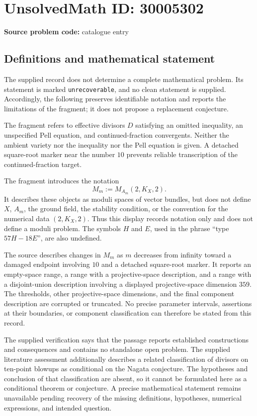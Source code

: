 \documentclass[11pt]{article}
\begin{document}
\section*{UnsolvedMath ID: 30005302}
\textbf{Source problem code:} catalogue entry
\subsection{Definitions and mathematical statement}
The supplied record does not determine a complete mathematical problem. Its statement is marked \texttt{unrecoverable}, and no clean statement is supplied. Accordingly, the following preserves identifiable notation and reports the limitations of the fragment; it does not propose a replacement conjecture.

The fragment refers to effective divisors \(D\) satisfying an omitted inequality, an unspecified Pell equation, and continued-fraction convergents. Neither the ambient variety nor the inequality nor the Pell equation is given. A detached square-root marker near the number \(10\) prevents reliable transcription of the continued-fraction target.

The fragment introduces the notation
\[
M_m:=M_{A_m}(2,K_X,2).
\]
It describes these objects as moduli spaces of vector bundles, but does not define \(X\), \(A_m\), the ground field, the stability condition, or the convention for the numerical data \((2,K_X,2)\). Thus this display records notation only and does not define a moduli problem. The symbols \(H\) and \(E\), used in the phrase ``type \(57H-18E\)'', are also undefined.

The source describes changes in \(M_m\) as \(m\) decreases from infinity toward a damaged endpoint involving \(10\) and a detached square-root marker. It reports an empty-space range, a range with a projective-space description, and a range with a disjoint-union description involving a displayed projective-space dimension \(359\). The thresholds, other projective-space dimensions, and the final component description are corrupted or truncated. No precise parameter intervals, assertions at their boundaries, or component classification can therefore be stated from this record.

The supplied verification says that the passage reports established constructions and consequences and contains no standalone open problem. The supplied literature assessment additionally describes a related classification of divisors on ten-point blowups as conditional on the Nagata conjecture. The hypotheses and conclusion of that classification are absent, so it cannot be formulated here as a conditional theorem or conjecture. A precise mathematical statement remains unavailable pending recovery of the missing definitions, hypotheses, numerical expressions, and intended question.
\end{document}
